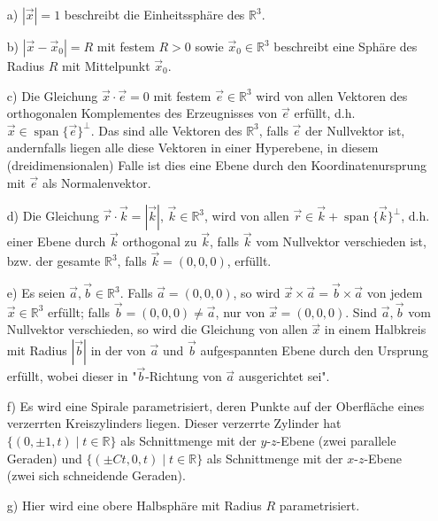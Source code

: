 \documentclass[11pt]{article}
\theoremstyle{plain}
\theoremstyle{definition}
\theoremstyle{remark}
\newcommand{\R}{\mathbb{R}}
\begin{document}
\begin{itemize}
\item[a)] 
$ | \vec{x} | = 1 $ beschreibt die Einheitssphäre des $ \R^3 $. 

\item[b)] 
$ | \vec{x} - \vec{x}_0 | = R $ mit festem $ R > 0 $ sowie $ \vec{x}_0 \in \R^3 $ beschreibt eine Sphäre des Radius $ R $ mit Mittelpunkt $ \vec{x}_0 $. 

\item[c)] 
Die Gleichung $ \vec{x} \cdot \vec{e} = 0 $ mit festem $ \vec{e} \in \R^3 $ 
wird von allen Vektoren des orthogonalen Komplementes des Erzeugnisses von $ \vec{e} $ erfüllt, d.h. $ \vec{x} \in \operatorname{span} \{ \vec{e} \}^\perp $. 
Das sind alle Vektoren des $ \R^3 $, falls $ \vec{e} $ der Nullvektor ist, andernfalls liegen alle diese Vektoren in einer Hyperebene, in diesem (dreidimensionalen) Falle ist dies eine Ebene durch den Koordinatenursprung mit $ \vec{e} $ als Normalenvektor. 

\item[d)] 
Die Gleichung $ \vec r \cdot \vec k = | \vec k | $, $ \vec k \in\R^3 $, wird von allen $ \vec r \in \vec k + \operatorname{span} \{ \vec k \}^\perp $, d.h. einer Ebene durch $ \vec k $ orthogonal zu $ \vec k $, falls $ \vec k $ vom Nullvektor verschieden ist, bzw. der gesamte $ \R^3 $, falls $ \vec k = (0,0,0) $, erfüllt. 

\item[e)] 
Es seien $ \vec a, \vec b \in \R^3 $. Falls $ \vec a = (0,0,0) $, so wird $ \vec x \times \vec a = \vec b \times \vec a $ von jedem $ \vec x \in \R^3 $ erfüllt; falls $ \vec b = (0,0,0) \neq \vec a $, nur von $ \vec x = (0,0,0) $. Sind $ \vec a, \vec b $ vom Nullvektor verschieden, so wird die Gleichung von allen $ \vec x $ in einem Halbkreis mit Radius $ |\vec b| $ in der von $ \vec a $ und $ \vec b $ aufgespannten Ebene durch den Ursprung erfüllt, wobei dieser in "$ \vec b $-Richtung von $ \vec a $ ausgerichtet sei". 

\item[f)]
Es wird eine Spirale parametrisiert, deren Punkte auf der Oberfläche eines verzerrten Kreiszylinders liegen. Dieser verzerrte Zylinder hat $\{ (0,\pm 1, t) \mid t \in \R \}$ als Schnittmenge mit der $y$-$z$-Ebene (zwei parallele Geraden) und $\{ (\pm Ct, 0, t) \mid t \in \R\}$ als Schnittmenge mit der $x$-$z$-Ebene (zwei sich schneidende Geraden).

\item[g)] 
Hier wird eine obere Halbsphäre mit Radius $ R $ parametrisiert. 
\end{itemize}
\end{document}
